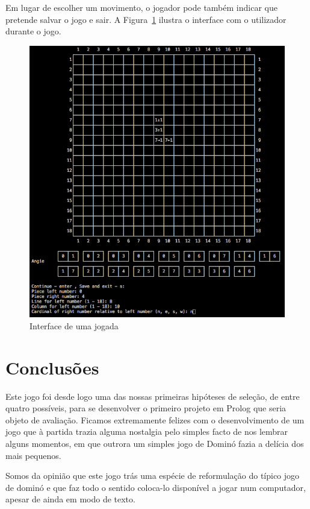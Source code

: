 \documentclass[a4paper]{article}
\begin{document}
Em lugar de escolher um movimento, o jogador pode também indicar que pretende salvar o jogo e sair. A Figura~\ref{input_mid} ilustra o interface com o utilizador durante o jogo.

\begin{figure}[htbp]
\begin{center}
\includegraphics[scale=0.5]{input_mid.jpg}
\caption{Interface de uma jogada}
\label{input_mid}
\end{center}
\end{figure}


\section{Conclusões}

Este jogo foi desde logo uma das nossas primeiras hipóteses de seleção, de entre quatro possíveis, para se desenvolver o primeiro projeto em Prolog que seria objeto de avaliação. Ficamos extremamente felizes com o desenvolvimento de um jogo que à partida trazia alguma nostalgia pelo simples facto de nos lembrar alguns momentos, em que outrora um simples jogo de Dominó fazia a delícia dos mais pequenos. 

Somos da opinião que este jogo trás uma espécie de reformulação do típico jogo de dominó e que faz todo o sentido coloca-lo disponível a jogar num computador, apesar de ainda em modo de texto.
\end{document}

